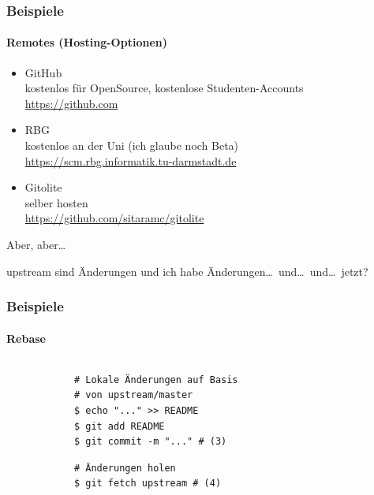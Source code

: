 \documentclass[]{beamer}
\begin{document}
\begin{frame}
	\frametitle{Beispiele}
	\framesubtitle{Remotes (Hosting-Optionen)}
	\begin{itemize}
		\item
			GitHub\\
			kostenlos für OpenSource, kostenlose Studenten-Accounts\\
			\url{https://github.com}
		\item
			RBG\\
			kostenlos an der Uni (ich glaube noch Beta)\\
			\url{https://scm.rbg.informatik.tu-darmstadt.de}
		\item
			Gitolite\\
			selber hosten\\
			\url{https://github.com/sitaramc/gitolite}
	\end{itemize}
\end{frame}

\begin{frame}
	\fontsize{30}{10}\selectfont Aber, aber\ldots
	\vspace*{0.5cm}

	\fontsize{20}{10}\selectfont upstream sind Änderungen und ich habe
	Änderungen\ldots\ und\ldots\ und\ldots\ jetzt?
\end{frame}

\begin{frame}[fragile]
	\frametitle{Beispiele}
	\framesubtitle{Rebase}
	\begin{columns}[T]
		\begin{column}{7.5cm}
			\begin{verbatim}
			# Lokale Änderungen auf Basis
			# von upstream/master
			$ echo "..." >> README
			$ git add README
			$ git commit -m "..." # (3)
			\end{verbatim}

			\begin{verbatim}
			# Änderungen holen
			$ git fetch upstream # (4)
			\end{verbatim}
		\end{column}
		\begin{column}{2.5cm}
		\end{column}
	\end{columns}
\end{frame}
\end{document}
